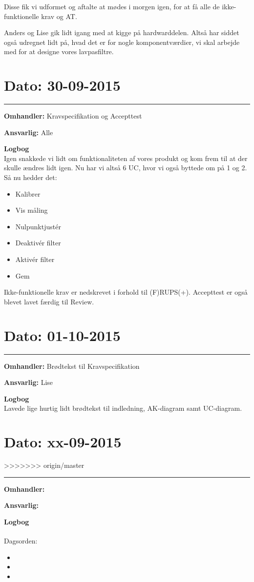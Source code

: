 Disse fik vi udformet og aftalte at mødes i morgen igen, for at få alle de ikke-funktionelle krav og AT. 

Anders og Lise gik lidt igang med at kigge på hardwarddelen. Altså har siddet også udregnet lidt på, hvad det er for nogle komponentværdier, vi skal arbejde med for at designe vores lavpasfiltre.  

\section{Dato: 30-09-2015 }
\hrule

\textbf{Omhandler:} Kravspecifikation og Accepttest  

\textbf{Ansvarlig:} Alle 

\textbf{Logbog}
\\
Igen snakkede vi lidt om funktionaliteten af vores produkt og kom frem til at der skulle ændres lidt igen. Nu har vi altså 6 UC, hvor vi også byttede om på 1 og 2. Så nu hedder det: 
\begin{itemize}
	\item Kalibrer
	\item Vis måling 
	\item Nulpunktjustér 
	\item Deaktivér filter 
	\item Aktivér filter
	\item Gem 
\end{itemize}

Ikke-funktionelle krav er nedskrevet i forhold til (F)RUPS(+). Accepttest er også blevet lavet færdig til Review. 


\section{Dato: 01-10-2015 }
\hrule

\textbf{Omhandler:} Brødtekst til Kravspecifikation 

\textbf{Ansvarlig:} Lise 

\textbf{Logbog}
\\
Lavede lige hurtig lidt brødtekst til indledning, AK-diagram samt UC-diagram. 


\section{Dato: xx-09-2015 }
>>>>>>> origin/master
\hrule

\textbf{Omhandler:}  

\textbf{Ansvarlig:} 

\textbf{Logbog}
\\
\\
Dagsorden:
\begin{itemize}
	\item 
	\item 
	\item 
\end{itemize}